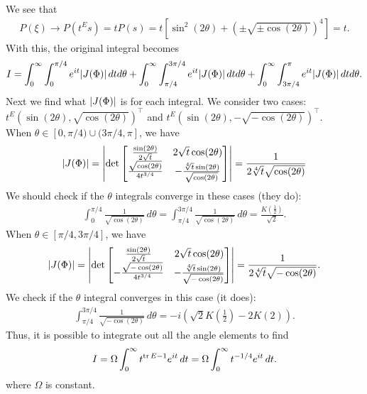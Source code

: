 \documentclass{article}
\theoremstyle{definition}
\newcommand{\f}[2]{\frac{#1}{#2}}
\newcommand{\lp}{\left(}
\newcommand{\rp}{\right)}
\newcommand{\lb}{\left[}
\newcommand{\rb}{\right]}
\begin{document}
\begin{enumerate}
\begin{enumerate}
\begin{enumerate}
		We see that 
		\begin{align}
		P(\xi)\to P(t^Es) = tP(s) = t\lb \sin^2(2\theta) + \lp\pm \sqrt{\pm \cos(2\theta)}\rp^4  \rb = t.
		\end{align}
		With this, the original integral becomes 
		\begin{align}
		I = \int^\infty_0 \int^{\pi/4}_0 e^{it}\abs{J(\Phi)}\,dtd\theta + \int^\infty_0\int^{3\pi/4}_{\pi/4}e^{it}\abs{J(\Phi)}\,dtd\theta + \int^\infty_0 \int^{\pi}_{3\pi/4}e^{it}\abs{J(\Phi)}\,dtd\theta. 
		\end{align}
		Next we find what $\abs{J(\Phi)}$ is for each integral. We consider two cases: $t^E(\sin(2\theta),\sqrt{\cos(2\theta)})^\top$ and $t^E(\sin(2\theta), -\sqrt{-\cos(2\theta)})^\top$. \\
		
		When $\theta\in [0,\pi/4) \cup (3\pi/4,\pi]$, we have
		\begin{align}
		\abs{J(\Phi)} 
		= 
		\abs{\det\begin{bmatrix}
		\frac{\sin (2 \theta )}{2 \sqrt{t}} & 2 \sqrt{t} \cos (2 \theta ) \\
		\frac{\sqrt{\cos (2 \theta )}}{4 t^{3/4}} & -\frac{\sqrt[4]{t} \sin (2 \theta )}{\sqrt{\cos (2\theta )}} 
		\end{bmatrix}} = \frac{1}{2 \sqrt[4]{t} \sqrt{\cos (2 \theta )}}
		\end{align}
		We should check if the $\theta$ integrals converge in these cases (they do):
		\begin{align}
		\int^{\pi/4}_0 \f{1}{\sqrt{\cos(2\theta)}}\,d\theta = \int^{3\pi/4}_{\pi/4} \f{1}{\sqrt{\cos(2\theta)}}\,d\theta = \frac{K\left(\frac{1}{2}\right)}{\sqrt{2}}.
		\end{align}
		When $\theta \in [\pi/4,3\pi/4]$, we have
		\begin{align}
		\abs{J(\Phi)} =\abs{\det\begin{bmatrix}
			\frac{\sin (2 \theta )}{2 \sqrt{t}} & 2 \sqrt{t} \cos (2 \theta ) \\
			-\frac{\sqrt{-\cos (2 \theta )}}{4 t^{3/4}} & -\frac{\sqrt[4]{t} \sin (2 \theta )}{\sqrt{-\cos
					(2 \theta )}} 
			\end{bmatrix}} = \frac{1}{2 \sqrt[4]{t} \sqrt{-\cos (2 \theta )}}.
		\end{align}
		We check if the $\theta$ integral converges in this case (it does):
		\begin{align}
		\int^{3\pi/4}_{\pi/4}\f{1}{\sqrt{-\cos(2\theta)}}\,d\theta = -i \left(\sqrt{2} K\left(\frac{1}{2}\right)-2 K(2)\right).
		\end{align}
		Thus, it is possible to integrate out all the angle elements to find 
		\begin{align}
		I = \Omega\int^\infty_0 t^{\tr E- 1 }e^{it}\,dt=  \Omega\int^\infty_0 t^{-1/4}e^{it}\,dt. 
		\end{align}
		where $\Omega$ is constant. \\
		

\end{enumerate}
\end{enumerate}
\end{enumerate}
\end{document}

